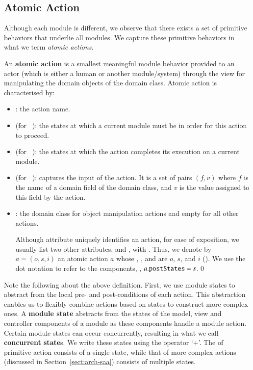 \subsection{Atomic Action} \label{sect:arch-atomic-action}
Although each module is different, we observe that there exists a set of primitive behaviors that underlie all modules. We capture these primitive behaviors in what we term \textit{atomic actions}.
%
\begin{definition} \label{def:atomic-action}
An \textbf{atomic action} is a smallest meaningful module behavior provided to an actor (which is either a human or another module/system) through the view for manipulating the domain objects of the domain class.
%
Atomic action is characterised by: 
\begin{itemize}
\item {}: the action name.
%
\item {} (for ~\cite{omg_unified_2017}): the states at which a current module must be in order for this action to proceed.
%
\item {} (for ~\cite{omg_unified_2017}): the states at which the action completes its execution on a current module.
%
\item {} (for ~\cite{omg_unified_2017}): captures the input of the action. It is a set of pairs $(f,v)$ where $f$ is the name of a domain field of the domain class, and $v$ is the value assigned to this field by the action. 
%
\item {}: the domain class for object manipulation actions and empty for all other actions.

Although attribute  uniquely identifies an action, for ease of exposition, we usually list two other attributes,  and , with .
%
Thus, we denote by $ a = (o,s,i) $ an atomic action $a$ whose , , and  are $ o $, $ s $, and $i$ (\resp). We use the dot notation to refer to the components, \eg, $ a.{\tt postStates} = s$.\qed
\end{itemize}
\end{definition}

Note the following about the above definition. 
First, we use module states to abstract from the local pre- and post-conditions of each action. This abstraction enables us to flexibly combine actions based on states to construct more complex ones. A \textbf{module state} abstracts from the states of the model, view and controller components of a module as these components handle a module action. Certain module states can occur concurrently, resulting in what we call \textbf{concurrent state}s. We write these states using the operator `+'. 
The  of primitive action consists of a single state, while that of more complex actions (discussed in Section~\ref{sect:arch-saa}) consists of multiple states.

